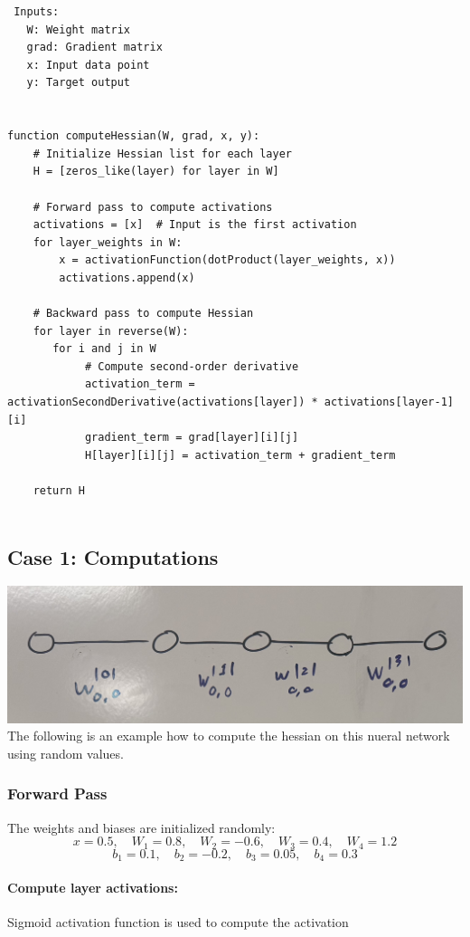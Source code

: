 \documentclass{article}
\begin{document}
\begin{verbatim}
 Inputs:
   W: Weight matrix 
   grad: Gradient matrix 
   x: Input data point
   y: Target output


function computeHessian(W, grad, x, y):
    # Initialize Hessian list for each layer
    H = [zeros_like(layer) for layer in W]

    # Forward pass to compute activations
    activations = [x]  # Input is the first activation
    for layer_weights in W:
        x = activationFunction(dotProduct(layer_weights, x))
        activations.append(x)

    # Backward pass to compute Hessian
    for layer in reverse(W):
       for i and j in W
            # Compute second-order derivative
            activation_term = activationSecondDerivative(activations[layer]) * activations[layer-1][i]
            gradient_term = grad[layer][i][j]
            H[layer][i][j] = activation_term + gradient_term

    return H


\end{verbatim}

\subsection{Case 1: Computations}
\includegraphics[scale=0.1]{../figs/Case 1.png} \\[0.5cm]

The following is an example how to compute the hessian on this nueral network using random values.





\subsubsection{Forward Pass}
The weights and biases are initialized randomly:
\[
x = 0.5, \quad W_1 = 0.8, \quad W_2 = -0.6, \quad W_3 = 0.4, \quad W_4 = 1.2
\]
\[
b_1 = 0.1, \quad b_2 = -0.2, \quad b_3 = 0.05, \quad b_4 = 0.3
\]
\paragraph{Compute layer activations:} Sigmoid activation function is used to compute the activation
\end{document}
